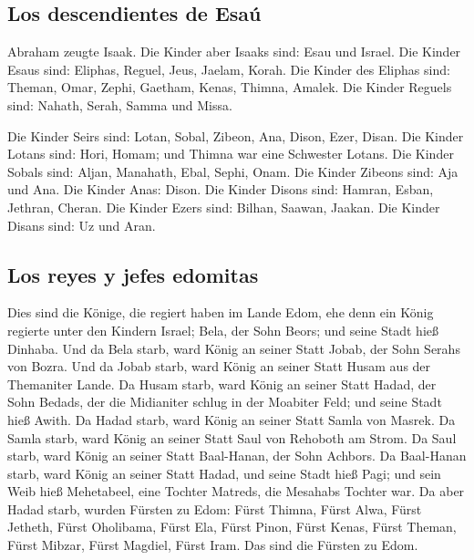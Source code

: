 \hypertarget{los-descendientes-de-esauxfa}{%
\subsection{Los descendientes de
Esaú}\label{los-descendientes-de-esauxfa}}

 Abraham zeugte Isaak. Die Kinder aber Isaaks sind: Esau
und Israel.  Die Kinder Esaus sind: Eliphas, Reguel,
Jeus, Jaelam, Korah.  Die Kinder des Eliphas sind:
Theman, Omar, Zephi, Gaetham, Kenas, Thimna, Amalek.  Die
Kinder Reguels sind: Nahath, Serah, Samma und Missa.

 Die Kinder Seirs sind: Lotan, Sobal, Zibeon, Ana, Dison,
Ezer, Disan.  Die Kinder Lotans sind: Hori, Homam; und
Thimna war eine Schwester Lotans.  Die Kinder Sobals
sind: Aljan, Manahath, Ebal, Sephi, Onam. Die Kinder Zibeons sind: Aja
und Ana.  Die Kinder Anas: Dison. Die Kinder Disons sind:
Hamran, Esban, Jethran, Cheran.  Die Kinder Ezers sind:
Bilhan, Saawan, Jaakan. Die Kinder Disans sind: Uz und Aran.

\hypertarget{los-reyes-y-jefes-edomitas}{%
\subsection{Los reyes y jefes
edomitas}\label{los-reyes-y-jefes-edomitas}}

 Dies sind die Könige, die regiert haben im Lande Edom,
ehe denn ein König regierte unter den Kindern Israel; Bela, der Sohn
Beors; und seine Stadt hieß Dinhaba.  Und da Bela starb,
ward König an seiner Statt Jobab, der Sohn Serahs von Bozra.
 Und da Jobab starb, ward König an seiner Statt Husam aus
der Themaniter Lande.  Da Husam starb, ward König an
seiner Statt Hadad, der Sohn Bedads, der die Midianiter schlug in der
Moabiter Feld; und seine Stadt hieß Awith.  Da Hadad
starb, ward König an seiner Statt Samla von Masrek.  Da
Samla starb, ward König an seiner Statt Saul von Rehoboth am Strom.
 Da Saul starb, ward König an seiner Statt Baal-Hanan,
der Sohn Achbors.  Da Baal-Hanan starb, ward König an
seiner Statt Hadad, und seine Stadt hieß Pagi; und sein Weib hieß
Mehetabeel, eine Tochter Matreds, die Mesahabs Tochter war.
 Da aber Hadad starb, wurden Fürsten zu Edom: Fürst
Thimna, Fürst Alwa, Fürst Jetheth,  Fürst Oholibama,
Fürst Ela, Fürst Pinon,  Fürst Kenas, Fürst Theman, Fürst
Mibzar,  Fürst Magdiel, Fürst Iram. Das sind die Fürsten
zu Edom.

